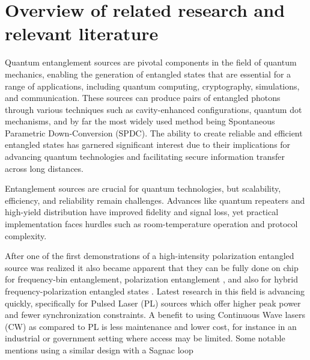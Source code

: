 \documentclass{article}
\theoremstyle{mytheoremstyle}
\theoremstyle{mytheoremstyle}
\theoremstyle{myproblemstyle}
\begin{document}
\section{Overview of related research and relevant literature}
Quantum entanglement sources are pivotal components in the field of quantum mechanics, enabling the generation of entangled states
that are essential for a range of applications, including quantum computing, cryptography, simulations, and communication.
These sources can produce pairs of entangled photons through various techniques such as cavity-enhanced configurations,
quantum dot mechanisms, and by far the most widely used method being Spontaneous Parametric Down-Conversion \cite{jesseSPDC} (SPDC).
The ability to create reliable and efficient entangled states has garnered significant interest due to their
implications for advancing quantum technologies and facilitating secure information transfer across long distances.
\par Entanglement sources are crucial for quantum technologies, but scalability, efficiency,
and reliability remain challenges. Advances like quantum repeaters and high-yield distribution have improved fidelity and signal loss,
yet practical implementation faces hurdles such as room-temperature operation and protocol complexity.
\par After one of the first \cite{Kwiat_1995} demonstrations of a high-intensity polarization entangled source was realized it also
became apparent that they can be fully done on chip \cite{S_G_S_C_F_B_L_G_B_2022} for frequency-bin entanglement,
polarization entanglement \cite{L_Z_F_F_L_L_W_R_D_X_etal._2017}, and also for hybrid frequency-polarization
entangled states \cite{F_R_D_F_L_M_A_B_D_2023}. Latest research in this field is advancing quickly, specifically for
Pulsed Laser (PL) sources which offer higher peak power and fewer synchronization constraints.
A benefit to using Continuous Wave lasers (CW) as compared to PL is less maintenance and lower cost, for instance in an industrial or government
setting where access may be limited. Some notable mentions using a similar design with a Sagnac loop
\end{document}
